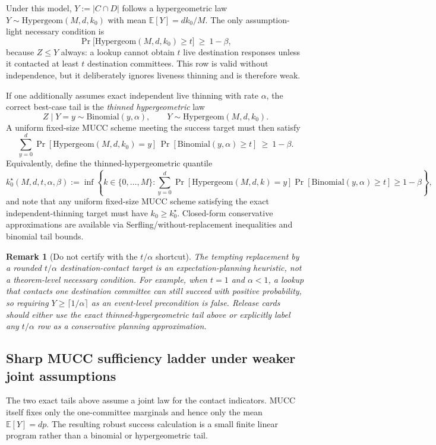 \documentclass[11pt]{article}
\newtheorem{remark}{Remark}
\newcommand{\E}{\mathbb{E}}
\begin{document}
Under this model, $Y:=|C\cap D|$ follows a hypergeometric law $Y\sim \mathrm{Hypergeom}(M,d,k_0)$ with mean $\E[Y]=dk_0/M$.
The only assumption-light necessary condition is
\[
\Pr\!\bigl[\mathrm{Hypergeom}(M,d,k_0)\ge t\bigr]\ \ge\ 1-\beta,
\]
because $Z\le Y$ always: a lookup cannot obtain $t$ live destination responses unless it contacted at least $t$ destination committees.
This row is valid without independence, but it deliberately ignores liveness thinning and is therefore weak.

If one additionally assumes exact independent live thinning with rate $\alpha$, the correct best-case tail is the \emph{thinned hypergeometric} law
\[
Z\mid Y=y \sim \mathrm{Binomial}(y,\alpha),
\qquad
Y\sim\mathrm{Hypergeom}(M,d,k_0).
\]
A uniform fixed-size MUCC scheme meeting the success target must then satisfy
\[
\sum_{y=0}^{d} \Pr[\mathrm{Hypergeom}(M,d,k_0)=y]\,
       \Pr[\mathrm{Binomial}(y,\alpha)\ge t]
\ \ge\ 1-\beta.
\]
Equivalently, define the thinned-hypergeometric quantile
\[
k_0^{\star}(M,d,t,\alpha,\beta)
:= \inf\left\{k\in\{0,\dots,M\}: \sum_{y=0}^{d} \Pr[\mathrm{Hypergeom}(M,d,k)=y]\Pr[\mathrm{Binomial}(y,\alpha)\ge t]\ge 1-\beta\right\},
\]
and note that any uniform fixed-size MUCC scheme satisfying the exact independent-thinning target must have $k_0\ge k_0^\star$.
Closed-form conservative approximations are available via Serfling/without-replacement inequalities and binomial tail bounds.\cite{serfling1974sampling,bardenet2015withoutreplacement}

\begin{remark}[Do not certify with the $t/\alpha$ shortcut]
The tempting replacement by a rounded $t/\alpha$ destination-contact target is an expectation-planning heuristic, not a theorem-level necessary condition.
For example, when $t=1$ and $\alpha<1$, a lookup that contacts one destination committee can still succeed with positive probability, so requiring $Y\ge\lceil1/\alpha\rceil$ as an event-level precondition is false.
Release cards should either use the exact thinned-hypergeometric tail above or explicitly label any $t/\alpha$ row as a conservative planning approximation.
\end{remark}

\subsection{Sharp MUCC sufficiency ladder under weaker joint assumptions}
\label{sec:mucc-sufficiency-ladder}
The two exact tails above assume a joint law for the contact indicators.  MUCC itself fixes only the one-committee marginals and hence only the mean $\E[Y]=dp$.  The resulting robust success calculation is a small finite linear program rather than a binomial or hypergeometric tail.
\end{document}
